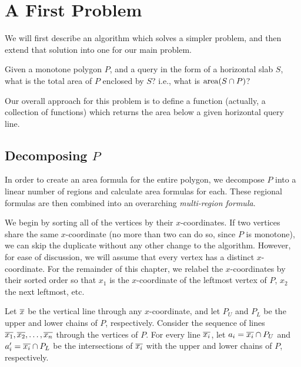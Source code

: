 \section{A First Problem}
\label{:monotonep:approach}

We will first describe an algorithm which solves a simpler problem, and then extend that solution into one for our main problem.

\begin{problem}
Given a monotone polygon $P$, and a query in the form of a horizontal slab $S$, what is the total area of $P$ enclosed by $S$?  i.e., what is $\operatorname{area}\!\left(S \cap P\right)$?
\end{problem}

Our overall approach for this problem is to define a function (actually, a collection of functions) which returns the area below a given horizontal query line. 

\subsection{Decomposing $P$}
\label{sec:decompose}

In order to create an area formula for the entire polygon, we decompose $P$ into a linear number of regions and calculate area formulas for each. These regional formulas are then combined into an overarching \emph{multi-region formula}.

We begin by sorting all of the vertices by their $x$-coordinates. 
If two vertices share the same $x$-coordinate (no more than two can do so, since $P$ is monotone), we can skip the duplicate without any other change to the algorithm. 
However, for ease of discussion, we will assume that every vertex has a distinct $x$-coordinate.
For the remainder of this chapter, we relabel the $x$-coordinates by their sorted order so that $x_1$ is the $x$-coordinate of the leftmost vertex of $P$, $x_2$ the next leftmost, etc.

Let $\overline{x}$ be the vertical line through any $x$-coordinate, and let $P_U$ and $P_L$ be the upper and lower chains of $P$, respectively. Consider the sequence of lines $\overline{x_1}, \overline{x_2}, \ldots, \overline{x_n}$ through the vertices of $P$.
For every line $\overline{x_i}$, let $a_i = \overline{x_i} \cap P_U$ and $a_i' = \overline{x_i} \cap P_L$ be the intersections of $\overline{x_i}$ with the upper and lower chains of $P$, respectively.

